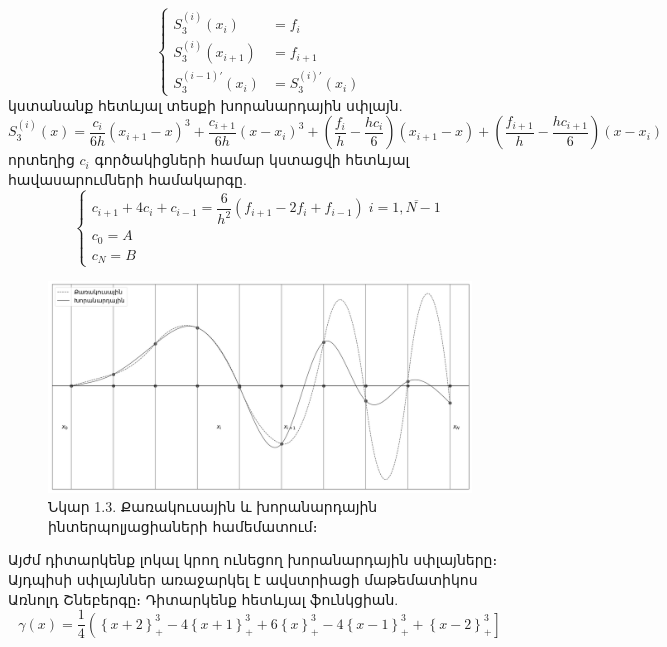 \documentclass[fleqn, bachelor,subf,12pt,notitlepage]{article}
\begin{document}
\begin{equation}
\begin{cases}
				S_{3}^{(i)}(x_{i}) &=f_{i}\\
				S_{3}^{(i)}(x_{i+1}) &= f_{i+1}\\
				S_{3}^{(i-1)'}(x_{i}) &= S_{3}^{(i)'}(x_{i})

\end{cases}
\end{equation}
կստանանք հետևյալ տեսքի խորանարդային սփլայն.
\begin{equation}
	S_{3}^{(i)}(x) = \dfrac{c_{i}}{6h}\left(x_{i+1}-x\right)^{3}+\dfrac{c_{i+1}}{6h}\left(x-x_{i}\right)^{3}+\left(\dfrac{f_{i}}{h}-\dfrac{hc_{i}}{6}\right)\left(x_{i+1}-x\right)+\left(\dfrac{f_{i+1}}{h}-\dfrac{hc_{i+1}}{6}\right)\left(x-x_{i}\right)
\end{equation}
որտեղից $c_{i}$ գործակիցների համար կստացվի հետևյալ հավասարումների համակարգը.
\begin{equation}
\begin{cases}
c_{i+1}+4c_{i}+c_{i-1} = \dfrac{6}{h^2}\left(f_{i+1}-2f_{i}+f_{i-1}\right) \; i=\overline{1, N-1}\\
c_{0}=A\\
c_{N}=B
\end{cases}
\end{equation}
\begin{figure}[h!]
\centering
\includegraphics[width=1.0\textwidth]{images/quadratic_and_cubic_interploation}
\captionsetup{labelformat=empty}
\caption{Նկար 1.3. Քառակուսային և խորանարդային ինտերպոլյացիաների համեմատում։}
\end{figure}
\newpage
Այժմ դիտարկենք լոկալ կրող ունեցող խորանարդային սփլայները։ Այդպիսի սփլայններ առաջարկել է ավստրիացի մաթեմատիկոս Առնոլդ Շնեբերգը։
Դիտարկենք հետևյալ ֆունկցիան.
\begin{equation}
				\gamma(x)=\dfrac{1}{4}\left(\left\{x+2\right\}^{3}_{+} - 4\left\{x+1\right\}^{3}_{+}+ 6\left\{x\right\}^{3}_{+} -4\left\{x-1\right\}^{3}_{+} + \left\{x-2\right\}^{3}_{+}\right]
\end{equation}
\end{document}
